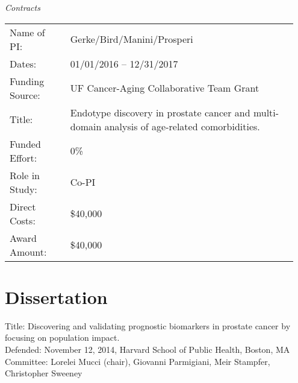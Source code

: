 \documentclass[11pt, a4paper]{article} %
\newcommand{\years}[1]{\marginnote{\scriptsize \raise .3ex\hbox{#1}}} %
\begin{document}
\emph{Contracts}

\begin{longtable}{@{}p{0.2\linewidth} p{0.75\linewidth}}
Name of PI: & Gerke/Bird/Manini/Prosperi \\
Dates: & 01/01/2016 -- 12/31/2017\\
Funding Source: & UF Cancer-Aging Collaborative Team Grant\\
Title: & Endotype discovery in prostate cancer and multi-domain analysis of age-related comorbidities.\\
Funded Effort: & 0\%\\
Role in Study: & Co-PI \\
Direct Costs: & \$40,000\\
Award Amount: & \$40,000\\
\end{longtable}


\section*{Dissertation}
Title: Discovering and validating prognostic biomarkers in prostate cancer by focusing on population impact. \\
Defended: November 12, 2014, Harvard School of Public Health, Boston, MA\\
Committee: Lorelei Mucci (chair), Giovanni Parmigiani, Meir Stampfer, Christopher Sweeney
\end{document}
